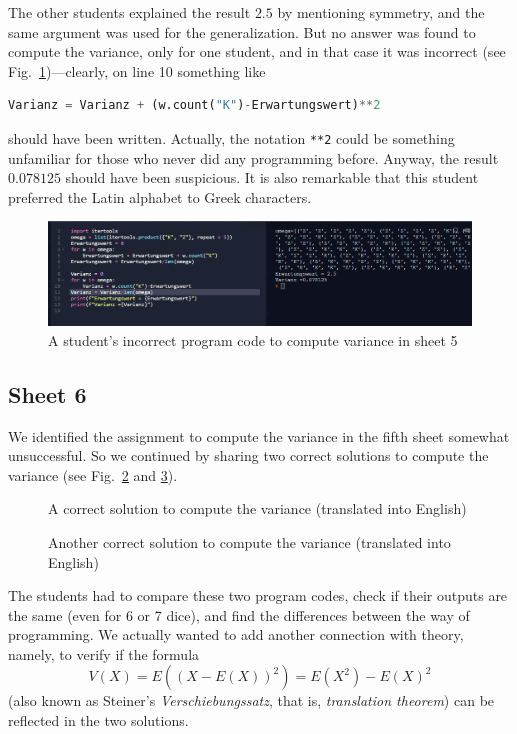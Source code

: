 \documentclass[]{interact}
\theoremstyle{plain}%
\theoremstyle{definition}
\theoremstyle{remark}
\begin{document}
The other students explained the result $2.5$ by mentioning symmetry, and the same argument was
used for the generalization. But no answer was found to compute the variance, only for one student,
and in that case it was incorrect (see Fig.~\ref{52})---clearly, on line 10 something like
\begin{lstlisting}[language=Python,firstnumber=10]
  Varianz = Varianz + (w.count("K")-Erwartungswert)**2
\end{lstlisting}
should have been written. Actually, the notation \texttt{**2} could be something unfamiliar
for those who never did any programming before. Anyway, the result $0.078125$ should have been
suspicious. It is also remarkable that this student preferred the Latin alphabet to Greek characters.
\begin{figure}
\begin{center}\includegraphics[width=1.0\textwidth]{52}
\caption{A student's incorrect program code to compute variance in sheet 5}
\label{52}
\end{center}
\end{figure}

\subsection*{Sheet 6}

We identified the assignment to compute the variance in the fifth sheet somewhat unsuccessful.
So we continued by sharing two correct solutions to compute the variance (see Fig.~\ref{6a.py}
and \ref{6b.py}).

\begin{figure}

\caption{A correct solution to compute the variance (translated into English)}
\label{6a.py}
\end{figure}

\begin{figure}

\caption{Another correct solution to compute the variance (translated into English)}
\label{6b.py}
\end{figure}

The students had to compare these two program codes, check if their outputs are the same
(even for 6 or 7 dice), and find the differences between the way of programming.
We actually wanted to add another connection with theory, namely, to verify if the
formula
\begin{equation}
V(X)=E((X-E(X))^2)=E(X^2)-E(X)^2
\label{variance}
\end{equation}
(also known as Steiner's \textit{Verschiebungssatz}, that is, \textit{translation theorem})
can be reflected in the two solutions.
\end{document}
